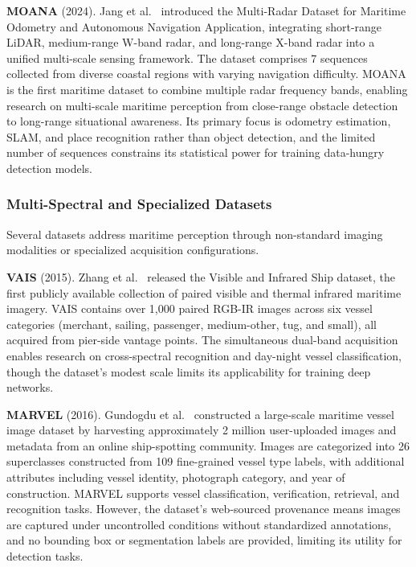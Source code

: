 \textbf{MOANA} (2024). Jang et al.~\cite{Jang2024MOANA} introduced the Multi-Radar
Dataset for Maritime Odometry and Autonomous Navigation Application, integrating
short-range LiDAR, medium-range W-band radar, and long-range X-band radar into a unified
multi-scale sensing framework. The dataset comprises 7 sequences collected from diverse
coastal regions with varying navigation difficulty. MOANA is the first maritime dataset
to combine multiple radar frequency bands, enabling research on multi-scale maritime
perception from close-range obstacle detection to long-range situational awareness. Its
primary focus is odometry estimation, SLAM, and place recognition rather than object
detection, and the limited number of sequences constrains its statistical power for
training data-hungry detection models.

\subsubsection{Multi-Spectral and Specialized Datasets}
\label{subsubsec:specialized}

Several datasets address maritime perception through non-standard imaging modalities or
specialized acquisition configurations.

\textbf{VAIS} (2015). Zhang et al.~\cite{Zhang2015VAIS} released the Visible and
Infrared Ship dataset, the first publicly available collection of paired visible and
thermal infrared maritime imagery. VAIS contains over 1,000 paired RGB-IR images across
six vessel categories (merchant, sailing, passenger, medium-other, tug, and small), all
acquired from pier-side vantage points. The simultaneous dual-band acquisition enables
research on cross-spectral recognition and day-night vessel classification, though the
dataset's modest scale limits its applicability for training deep networks.

\textbf{MARVEL} (2016). Gundogdu et al.~\cite{Gundogdu2016MARVEL} constructed a
large-scale maritime vessel image dataset by harvesting approximately 2 million
user-uploaded images and metadata from an online ship-spotting community. Images are
categorized into 26 superclasses constructed from 109 fine-grained vessel type labels,
with additional attributes including vessel identity, photograph category, and year of
construction. MARVEL supports vessel classification, verification, retrieval, and
recognition tasks. However, the dataset's web-sourced provenance means images are
captured under uncontrolled conditions without standardized annotations, and no bounding
box or segmentation labels are provided, limiting its utility for detection tasks.

